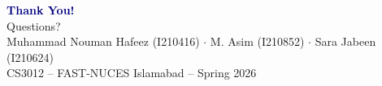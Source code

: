 \documentclass[aspectratio=169]{beamer}
\begin{document}
\begin{frame}
\centering
\Huge \textcolor{navy}{\textbf{Thank You!}} \\
\vspace{0.5cm}
\large Questions? \\
\vspace{1cm}
\footnotesize
Muhammad Nouman Hafeez (I210416) $\cdot$ M. Asim (I210852) $\cdot$ Sara Jabeen (I210624) \\
CS3012 -- FAST-NUCES Islamabad -- Spring 2026
\end{frame}
\end{document}
